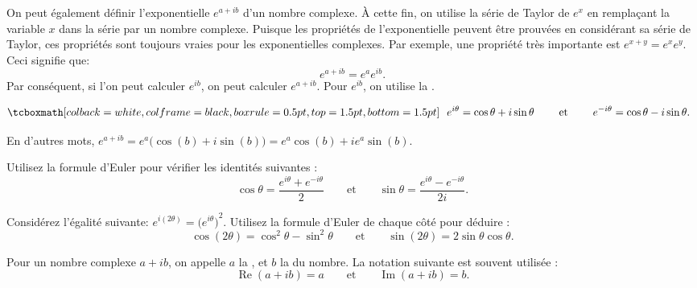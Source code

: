\pagebreak[2]
On peut également définir l'exponentielle $e^{a+ib}$ d'un nombre complexe. 
À cette fin, on utilise la série de Taylor de $e^x$ en remplaçant la variable $x$ dans la série par un nombre complexe. 
Puisque les propriétés de l'exponentielle peuvent être prouvées en considérant sa série de Taylor, ces propriétés sont toujours vraies pour les exponentielles complexes.  
Par exemple, une propriété très importante est   $e^{x+y} = e^x e^y$. 
Ceci signifie que: 
\begin{equation*}
	e^{a+ib} = e^a e^{ib}.
\end{equation*}
Par conséquent, si l'on peut  calculer $e^{ib}$, on peut calculer $e^{a+ib}$.  
Pour $e^{ib}$, on utilise la  \emph{}.

\begin{theorem} \label{eulersformula}
	\begin{equation*}
	\mybxbg{~~
		e^{i \theta} = \cos \theta + i \sin \theta
		\qquad \text{ et } \qquad
		e^{- i \theta} = \cos \theta - i \sin \theta .
	~~}
	\end{equation*}
\end{theorem}

En d'autres mots, $e^{a+ib} = e^a \bigl( \cos(b) + i \sin(b) \bigr) = e^a \cos(b) + i e^a \sin(b)$.

\begin{exercise}
	Utilisez la formule d'Euler pour vérifier les identités suivantes : 
	\begin{equation*}
		\cos \theta = \frac{e^{i \theta} + e^{-i \theta}}{2}
		\qquad \text{et} \qquad
		\sin \theta = \frac{e^{i \theta} - e^{-i \theta}}{2i}.
	\end{equation*}
\end{exercise}

\begin{exercise}
	Considérez l'égalité suivante: $e^{i(2\theta)} = {\bigl(e^{i \theta} \bigr)}^2$.  
	Utilisez la formule d'Euler de chaque côté pour déduire :
	\begin{equation*}
		\cos (2\theta) = \cos^2 \theta - \sin^2 \theta
		\qquad \text{et} \qquad
		\sin (2\theta) = 2 \sin \theta \cos \theta .
	\end{equation*}
\end{exercise}

Pour un nombre complexe $a+ib$, on appelle $a$ la \emph{},  
et $b$ la \emph{} du nombre.
La notation suivante est souvent utilisée : 
\begin{equation*}
	\operatorname{Re}(a+ib) = a
	\qquad \text{et} \qquad
	\operatorname{Im}(a+ib) = b.
\end{equation*}



